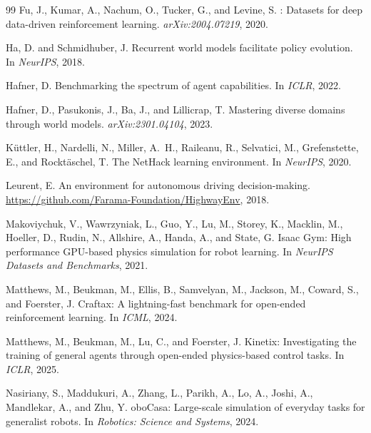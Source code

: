 \documentclass{article}
\begin{document}
\begin{thebibliography}{99}
Fu, J., Kumar, A., Nachum, O., Tucker, G., and Levine, S.
: Datasets for deep data-driven reinforcement learning.
\newblock \emph{arXiv:2004.07219}, 2020.

Ha, D. and Schmidhuber, J.
\newblock Recurrent world models facilitate policy evolution.
\newblock In \emph{NeurIPS}, 2018.

Hafner, D.
\newblock Benchmarking the spectrum of agent capabilities.
\newblock In \emph{ICLR}, 2022.

Hafner, D., Pasukonis, J., Ba, J., and Lillicrap, T.
\newblock Mastering diverse domains through world models.
\newblock \emph{arXiv:2301.04104}, 2023.

K\"uttler, H., Nardelli, N., Miller, A.~H., Raileanu, R., Selvatici, M.,
  Grefenstette, E., and Rockt\"aschel, T.
\newblock The {N}et{H}ack learning environment.
\newblock In \emph{NeurIPS}, 2020.

Leurent, E.
\newblock An environment for autonomous driving decision-making.
\newblock \url{https://github.com/Farama-Foundation/HighwayEnv}, 2018.

Makoviychuk, V., Wawrzyniak, L., Guo, Y., Lu, M., Storey, K., Macklin, M.,
  Hoeller, D., Rudin, N., Allshire, A., Handa, A., and State, G.
\newblock Isaac {G}ym: High performance {GPU}-based physics simulation for robot
  learning.
\newblock In \emph{NeurIPS Datasets and Benchmarks}, 2021.

Matthews, M., Beukman, M., Ellis, B., Samvelyan, M., Jackson, M., Coward, S.,
  and Foerster, J.
\newblock Craftax: A lightning-fast benchmark for open-ended reinforcement
  learning.
\newblock In \emph{ICML}, 2024.

Matthews, M., Beukman, M., Lu, C., and Foerster, J.
\newblock Kinetix: Investigating the training of general agents through
  open-ended physics-based control tasks.
\newblock In \emph{ICLR}, 2025.

Nasiriany, S., Maddukuri, A., Zhang, L., Parikh, A., Lo, A., Joshi, A.,
  Mandlekar, A., and Zhu, Y.
obo{C}asa: Large-scale simulation of everyday tasks for generalist
  robots.
\newblock In \emph{Robotics: Science and Systems}, 2024.


\end{thebibliography}
\end{document}
